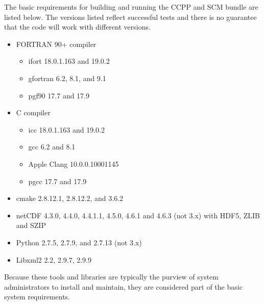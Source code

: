 The basic requirements for building and running the CCPP and SCM bundle are listed below. The versions listed reflect successful tests and there is no guarantee that the code will work with different versions.
\begin{itemize}
    \item FORTRAN 90+ compiler
    	\begin{itemize}
   	 \item ifort 18.0.1.163 and 19.0.2
	 \item gfortran 6.2, 8.1, and 9.1
	 \item pgf90 17.7 and 17.9
	 \end{itemize}
    \item C compiler
    	\begin{itemize}
	\item icc 18.0.1.163 and 19.0.2
	\item gcc 6.2 and 8.1
	\item Apple Clang 10.0.0.10001145
	\item pgcc 17.7 and 17.9
	\end{itemize}
    \item cmake 2.8.12.1, 2.8.12.2, and 3.6.2
    \item netCDF 4.3.0, 4.4.0, 4.4.1.1, 4.5.0, 4.6.1 and 4.6.3 (not 3.x) with HDF5, ZLIB and SZIP
    \item Python 2.7.5, 2.7.9, and 2.7.13 (not 3.x)
    \item Libxml2 2.2, 2.9.7, 2.9.9
\end{itemize}

Because these tools and libraries are typically the purview of system administrators to install and maintain, they are considered  part of the basic system requirements.

